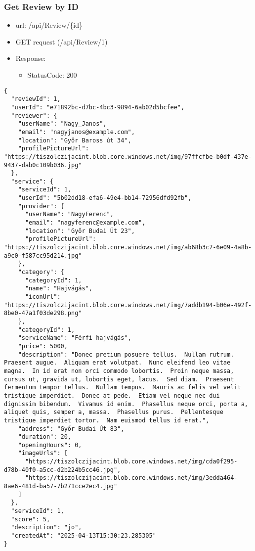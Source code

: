 \documentclass[11pt]{article}
\begin{document}
\subsubsection{Get Review by ID}
\label{sec:orge39dc78}
\begin{itemize}
\item url: /api/Review/\{id\}
\item GET request (/api/Review/1)
\item Response:
\begin{itemize}
\item StatusCode: 200
\end{itemize}
\end{itemize}
\begin{verbatim}
{
  "reviewId": 1,
  "userId": "e71892bc-d7bc-4bc3-9894-6ab02d5bcfee",
  "reviewer": {
    "userName": "Nagy_Janos",
    "email": "nagyjanos@example.com",
    "location": "Győr Baross út 34",
    "profilePictureUrl": "https://tiszolczijacint.blob.core.windows.net/img/97ffcfbe-b0df-437e-9437-dab0c109b036.jpg"
  },
  "service": {
    "serviceId": 1,
    "userId": "5b02dd18-efa6-49e4-bb14-72956dfd92fb",
    "provider": {
      "userName": "NagyFerenc",
      "email": "nagyferenc@example.com",
      "location": "Győr Budai Út 23",
      "profilePictureUrl": "https://tiszolczijacint.blob.core.windows.net/img/ab68b3c7-6e09-4a8b-a9c0-f587cc95d214.jpg"
    },
    "category": {
      "categoryId": 1,
      "name": "Hajvágás",
      "iconUrl": "https://tiszolczijacint.blob.core.windows.net/img/7addb194-b06e-492f-8be0-47a1f03de298.png"
    },
    "categoryId": 1,
    "serviceName": "Férfi hajvágás",
    "price": 5000,
    "description": "Donec pretium posuere tellus.  Nullam rutrum.  Praesent augue.  Aliquam erat volutpat.  Nunc eleifend leo vitae magna.  In id erat non orci commodo lobortis.  Proin neque massa, cursus ut, gravida ut, lobortis eget, lacus.  Sed diam.  Praesent fermentum tempor tellus.  Nullam tempus.  Mauris ac felis vel velit tristique imperdiet.  Donec at pede.  Etiam vel neque nec dui dignissim bibendum.  Vivamus id enim.  Phasellus neque orci, porta a, aliquet quis, semper a, massa.  Phasellus purus.  Pellentesque tristique imperdiet tortor.  Nam euismod tellus id erat.",
    "address": "Győr Budai Út 83",
    "duration": 20,
    "openingHours": 0,
    "imageUrls": [
      "https://tiszolczijacint.blob.core.windows.net/img/cda0f295-d78b-40f0-a5cc-d2b224b5cc46.jpg",
      "https://tiszolczijacint.blob.core.windows.net/img/3edda464-8ae6-481d-ba57-7b271cce2ec4.jpg"
    ]
  },
  "serviceId": 1,
  "score": 5,
  "description": "jo",
  "createdAt": "2025-04-13T15:30:23.285305"
}
\end{verbatim}
\end{document}
